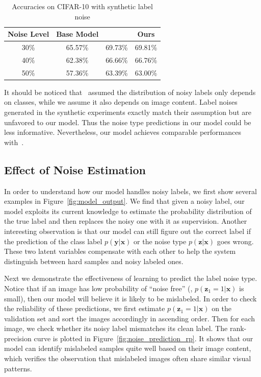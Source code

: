 \documentclass[10pt,twocolumn,letterpaper]{article}
\def\vec{\mathbf}
\begin{document}
\begin{table}
\begin{center}
\begin{tabular}{c|c|c|c}
\hline
Noise Level & Base Model & \cite{sukhbaatar2014learning} & Ours \\
\hline\hline
30\% & 65.57\% & 69.73\% & 69.81\% \\
\hline
40\% & 62.38\% & 66.66\% & 66.76\% \\
\hline
50\% & 57.36\% & 63.39\% & 63.00\% \\
\hline
\end{tabular}
\end{center}
\caption{Accuracies on CIFAR-10 with synthetic label noise}
\label{tab:accuracy_synthetic}
\end{table}

It should be noticed that~\cite{sukhbaatar2014learning} assumed the distribution of noisy labels only depends on classes, while we assume it also depends on image content. Label noises generated in the synthetic experiments exactly match their assumption but are unfavored to our model. Thus the noise type predictions in our model could be less informative. Nevertheless, our model achieves comparable performances with~\cite{sukhbaatar2014learning}.


\subsection{Effect of Noise Estimation} %
\label{sub:effect_of_noise_estimation}
In order to understand how our model handles noisy labels, we first show several examples in Figure~\ref{fig:model_output}. We find that given a noisy label, our model exploits its current knowledge to estimate the probability distribution of the true label and then replaces the noisy one with it as supervision. Another interesting observation is that our model can still figure out the correct label if the prediction of the class label $p(\vec{y}|\vec{x})$ or the noise type $p(\vec{z}|\vec{x})$ goes wrong. These two latent variables compensate with each other to help the system distinguish between hard samples and noisy labeled ones.

Next we demonstrate the effectiveness of learning to predict the label noise type. Notice that if an image has low probability of ``noise free'' (\ie, $p(\vec{z}_1=1|\vec{x})$ is small), then our model will believe it is likely to be mislabeled. In order to check the reliability of these predictions, we first estimate $p(\vec{z}_1=1|\vec{x})$ on the validation set and sort the images accordingly in ascending order. Then for each image, we check whether its noisy label mismatches its clean label. The rank-precision curve is plotted in Figure~\ref{fig:noise_prediction_rp}. It shows that our model can identify mislabeled samples quite well based on their image content, which verifies the observation that mislabeled images often share similar visual patterns.
\end{document}
